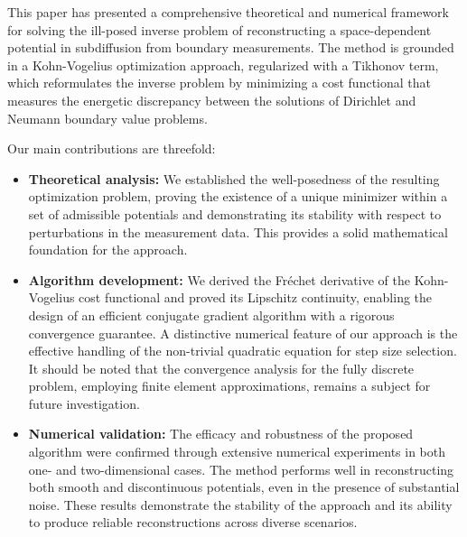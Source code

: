 \documentclass[a4paper,12pt,reqno,natbib]{amsart}
\begin{document}
{This paper has presented a comprehensive theoretical and numerical framework for solving the ill-posed inverse problem of reconstructing a space-dependent potential in subdiffusion from boundary measurements. The method is grounded in a Kohn-Vogelius  optimization approach, regularized with a Tikhonov term, which reformulates the inverse problem by minimizing a cost functional that measures the energetic discrepancy between the solutions of Dirichlet and Neumann boundary value problems.

Our main contributions are threefold:
\begin{itemize}
    \item \textbf{Theoretical analysis:} We established the well-posedness of the resulting optimization problem, proving the existence of a unique minimizer within a set of admissible potentials and demonstrating its stability with respect to perturbations in the measurement data. This provides a solid mathematical foundation for the approach.

    

    
    \item \textbf{Algorithm development:} We derived the Fr\'echet derivative of the Kohn-Vogelius cost functional and proved its Lipschitz continuity, enabling the design of an efficient conjugate gradient algorithm with a rigorous convergence guarantee. A distinctive numerical feature of our approach is the effective handling of the non-trivial quadratic equation for step size selection. It should be noted that the convergence analysis for the fully discrete problem, employing finite element approximations, remains a subject for future investigation.

\item \textbf{Numerical validation:} The efficacy and robustness of the proposed algorithm were confirmed through extensive numerical experiments in both one- and two-dimensional cases. The method performs well in reconstructing both smooth and discontinuous potentials, even in the presence of substantial noise. These results demonstrate the stability of the approach and its ability to produce reliable reconstructions across diverse scenarios.  
\end{itemize}


}
\end{document}

